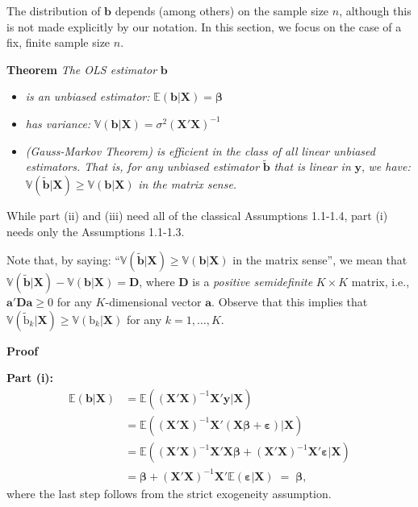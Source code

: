 \documentclass[
]{book}
\begin{document}
The distribution of \(\mathbf{b}\) depends (among others) on the sample
size \(n\), although this is not made explicitly by our notation. In this
section, we focus on the case of a fix, finite sample size \(n\).

\textbf{Theorem} \emph{The OLS estimator} \(\mathbf{b}\)

\begin{itemize}
\item
  \emph{is an unbiased estimator:} \(\mathbb{E}(\mathbf{b}|\mathbf{X})=\boldsymbol{\beta}\)
\item
  \emph{has variance:} \(\mathbb{V}(\mathbf{b}|\mathbf{X})=\sigma^2(\mathbf{X}'\mathbf{X})^{-1}\)
\item
  \emph{(Gauss-Markov Theorem) is efficient in the class of all linear unbiased estimators. That is, for any unbiased estimator}
  \(\tilde{\mathbf{b}}\) \emph{that is linear in} \(\mathbf{y}\), \emph{we have:}
  \(\mathbb{V}(\tilde{\mathbf{b}}|\mathbf{X}) \geq \mathbb{V}(\mathbf{b} | \mathbf{X})\) \emph{in the matrix sense.}
\end{itemize}

While part (ii) and (iii) need all of the classical Assumptions 1.1-1.4,
part (i) needs only the Assumptions 1.1-1.3.

Note that, by saying: ``\(\mathbb{V}(\tilde{\mathbf{b}}|\mathbf{X}) \geq \mathbb{V}(\mathbf{b} | \mathbf{X})\) in the
matrix sense'', we mean that
\(\mathbb{V}(\tilde{\mathbf{b}}|\mathbf{X}) - \mathbb{V}(\mathbf{b} | \mathbf{X}) = \mathbf{D}\), where \(\mathbf{D}\) is
a \emph{positive semidefinite} \(K\times K\) matrix, i.e.,
\(\mathbf{a}'\mathbf{D}\mathbf{a}\geq 0\) for any \(K\)-dimensional vector
\(\mathbf{a}\). Observe that this implies that
\(\mathbb{V}(\tilde{\text{b}}_k|\mathbf{X}) \geq \mathbb{V}({\textrm{b}}_k | \mathbf{X})\) for any
\(k=1,\dots,K\).\\

\hfill\break

\textbf{Proof}

\textbf{Part (i):}
\begin{align*}
\mathbb{E}(\mathbf{b}|\mathbf{X}) &= \mathbb{E}\left((\mathbf{X}'\mathbf{X})^{-1}\mathbf{X}'\mathbf{y}|\mathbf{X}\right)\\
   &= \mathbb{E}\left((\mathbf{X}'\mathbf{X})^{-1}\mathbf{X}'(\mathbf{X}\boldsymbol{\beta}+\boldsymbol{\varepsilon})|\mathbf{X}\right)\\
   &= \mathbb{E}\left((\mathbf{X}'\mathbf{X})^{-1}\mathbf{X}'\mathbf{X}\boldsymbol{\beta}+(\mathbf{X}'\mathbf{X})^{-1}\mathbf{X}'\boldsymbol{\varepsilon}|\mathbf{X}\right)\\
   &= \boldsymbol{\beta}+(\mathbf{X}'\mathbf{X})^{-1}\mathbf{X}'\mathbb{E}\left(\boldsymbol{\varepsilon}|\mathbf{X}\right)\;=\;\boldsymbol{\beta},
\end{align*}
where the last step follows from the strict exogeneity assumption.\\
\end{document}
